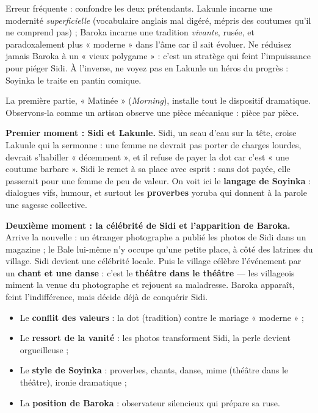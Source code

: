 \documentclass[11pt]{article}
\newcounter{popsec}
\newcounter{popsub}
\newcommand{\courssub}[1]{%
  \stepcounter{popsub}%
  \par\vspace{9pt}\noindent{\popxbold\fontsize{11.5}{13}\selectfont\color{popink}{\color{poporange}\thepopsec.\thepopsub}\hspace{6pt}#1}\par\nopagebreak\vspace{4pt}
}
\begin{document}
\begin{attention}
Erreur fréquente : confondre les deux prétendants. Lakunle incarne une modernité \emph{superficielle} (vocabulaire anglais mal digéré, mépris des coutumes qu'il ne comprend pas) ; Baroka incarne une tradition \emph{vivante}, rusée, et paradoxalement plus « moderne » dans l'âme car il sait évoluer. Ne réduisez jamais Baroka à un « vieux polygame » : c'est un stratège qui feint l'impuissance pour piéger Sidi. À l'inverse, ne voyez pas en Lakunle un héros du progrès : Soyinka le traite en pantin comique.
\end{attention}

\courssub{Lecture méthodique n°1 : la « Matinée »}

La première partie, « Matinée » (\emph{Morning}), installe tout le dispositif dramatique. Observons-la comme un artisan observe une pièce mécanique : pièce par pièce.

\textbf{Premier moment : Sidi et Lakunle.} Sidi, un seau d'eau sur la tête, croise Lakunle qui la sermonne : une femme ne devrait pas porter de charges lourdes, devrait s'habiller « décemment », et il refuse de payer la dot car c'est « une coutume barbare ». Sidi le remet à sa place avec esprit : sans dot payée, elle passerait pour une femme de peu de valeur. On voit ici le \textbf{langage de Soyinka} : dialogues vifs, humour, et surtout les \textbf{proverbes} yoruba qui donnent à la parole une sagesse collective.

\textbf{Deuxième moment : la célébrité de Sidi et l'apparition de Baroka.} Arrive la nouvelle : un étranger photographe a publié les photos de Sidi dans un magazine ; le Bale lui-même n'y occupe qu'une petite place, à côté des latrines du village. Sidi devient une célébrité locale. Puis le village célèbre l'événement par un \textbf{chant et une danse} : c'est le \textbf{théâtre dans le théâtre} — les villageois miment la venue du photographe et rejouent sa maladresse. Baroka apparaît, feint l'indifférence, mais décide déjà de conquérir Sidi.

\begin{aretenir}
\begin{itemize}
\item Le \textbf{conflit des valeurs} : la dot (tradition) contre le mariage « moderne » ;
\item Le \textbf{ressort de la vanité} : les photos transforment Sidi, la perle devient orgueilleuse ;
\item Le \textbf{style de Soyinka} : proverbes, chants, danse, mime (théâtre dans le théâtre), ironie dramatique ;
\item La \textbf{position de Baroka} : observateur silencieux qui prépare sa ruse.
\end{itemize}
\end{aretenir}
\end{document}

